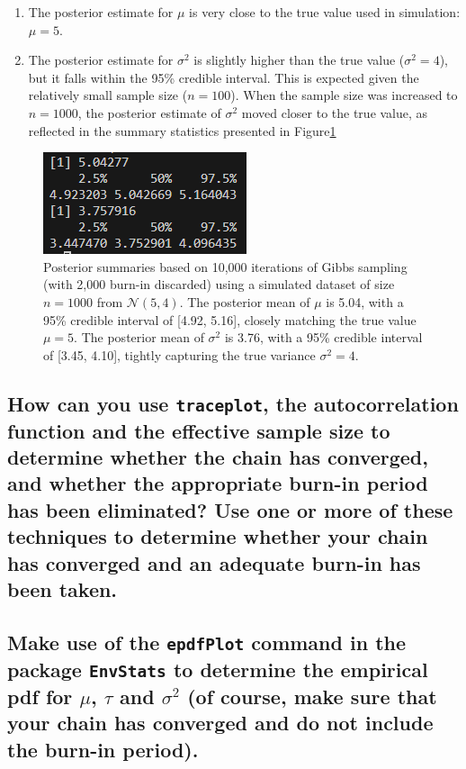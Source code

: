 \documentclass[]{article}
\begin{document}
\begin{enumerate}
	\item The posterior estimate for $\mu$ is very close to the true value used in simulation: $\mu = 5$.

	\item The posterior estimate for $\sigma^2$ is slightly higher than the true value ($\sigma^2 = 4$), but it falls within the 95\% credible interval. This is expected given the relatively small sample size ($n = 100$). When the sample size was increased to $n = 1000$, the posterior estimate of $\sigma^2$ moved closer to the true value, as reflected in the summary statistics presented in Figure\ref{fig:img-2-post-summary1}
\end{enumerate}

\begin{figure}[H]
	\centering
	\includegraphics[width=0.7\linewidth]{img/img-2-post-summary1}
	\caption{Posterior summaries based on 10,000 iterations of Gibbs sampling (with 2,000 burn-in discarded) using a simulated dataset of size $n = 1000$ from $\mathcal{N}(5, 4)$. The posterior mean of $\mu$ is 5.04, with a 95\% credible interval of [4.92, 5.16], closely matching the true value $\mu = 5$. The posterior mean of $\sigma^2$ is 3.76, with a 95\% credible interval of [3.45, 4.10], tightly capturing the true variance $\sigma^2 = 4$.}
	\label{fig:img-2-post-summary1}
\end{figure}




\subsection{How can you use \texttt{traceplot}, the autocorrelation function and the effective sample size to determine whether the chain has converged, and whether the appropriate burn-in period has been eliminated? Use one or more of these techniques to determine whether your chain has converged and an adequate burn-in has been taken.}	

\subsection{Make use of the \texttt{epdfPlot} command in the package \texttt{EnvStats} to determine the empirical pdf for $\mu$, $\tau$ and $\sigma^2$ (of course, make sure that your chain has converged and do not include the burn-in period).}
\end{document}
